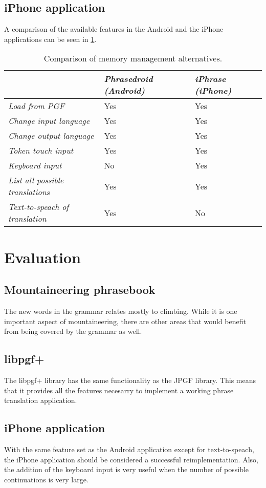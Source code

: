 \subsection{iPhone application}
A comparison of the available features in the Android and the iPhone applications can be seen in \ref{tbl:appcomparison}.
\begin{table}
\begin{center}
\begin{tabular}{|l|l|l|}
	\hline
	 & \emph{Phrasedroid (Android)} & \emph{iPhrase (iPhone)} \\ \hline
	\emph{Load from PGF} & Yes & Yes \\ \hline
	\emph{Change input language} & Yes & Yes \\ \hline
	\emph{Change output language} & Yes & Yes \\ \hline
	\emph{Token touch input} & Yes & Yes \\ \hline
	\emph{Keyboard input} & No & Yes \\ \hline
	\emph{List all possible translations} & Yes & Yes \\ \hline
	\emph{Text-to-speach of translation} & Yes & No \\ \hline
\end{tabular}
\end{center}
\caption{Comparison of memory management alternatives.}
\label{tbl:appcomparison}
\end{table}


\section{Evaluation}


\subsection{Mountaineering phrasebook}
The new words in the grammar relates mostly to climbing. While it is one important aspect of mountaineering, there are other areas that would benefit from being covered by the grammar as well.

\subsection{libpgf+}
The libpgf+ library has the same functionality as the JPGF library. This means that it provides all the features necesarry to implement a working phrase translation application.

\subsection{iPhone application}
With the same feature set as the Android application except for text-to-speach, the iPhone application should be considered a successful reimplementation. Also, the addition of the keyboard input is very useful when the number of possible continuations is very large.


